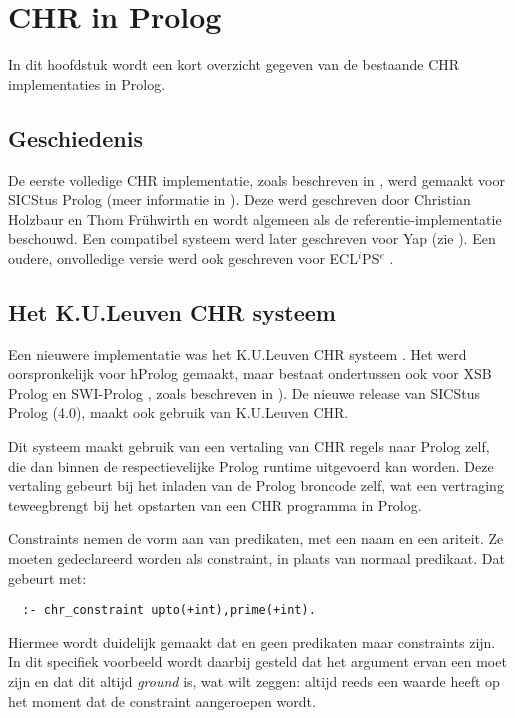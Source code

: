 \chapter{CHR in Prolog} \label{chap:chrprolog}

In dit hoofdstuk wordt een kort overzicht gegeven van de bestaande CHR implementaties in Prolog.

\section{Geschiedenis}

De eerste volledige CHR implementatie, zoals beschreven in \cite{christian:system}, werd gemaakt voor SICStus Prolog (meer informatie in \cite{sicstus}). Deze werd geschreven door Christian Holzbaur en Thom Fr\"uhwirth en wordt algemeen als de referentie-implementatie beschouwd. Een compatibel systeem werd later geschreven voor Yap (zie \cite{yap}). Een oudere, onvolledige versie werd ook geschreven voor ECL$^i$PS$^e$ \cite{eclipse}.

\section{Het K.U.Leuven CHR systeem}

Een nieuwere implementatie was het K.U.Leuven CHR systeem \cite{tom:kulchr}. Het werd oorspronkelijk voor hProlog gemaakt, maar bestaat ondertussen ook voor XSB Prolog \cite{xsb} en SWI-Prolog \cite{swiprolog}, zoals beschreven in \cite{tom:swi:wclp2005}). De nieuwe release van SICStus Prolog (4.0), maakt ook gebruik van K.U.Leuven CHR.

Dit systeem maakt gebruik van een vertaling van CHR regels naar Prolog zelf, die dan binnen de respectievelijke Prolog runtime uitgevoerd kan worden. Deze vertaling gebeurt bij het inladen van de Prolog broncode zelf, wat een vertraging teweegbrengt bij het opstarten van een CHR programma in Prolog.

Constraints nemen de vorm aan van predikaten, met een naam en een ariteit. Ze moeten gedeclareerd worden als constraint, in plaats van normaal predikaat. Dat gebeurt met: \begin{Verbatim}
  :- chr_constraint upto(+int),prime(+int).
\end{Verbatim}
Hiermee wordt duidelijk gemaakt dat  en  geen predikaten maar constraints zijn. In dit specifiek voorbeeld wordt daarbij gesteld dat het argument ervan een  moet zijn en dat dit altijd {\em ground} is, wat wilt zeggen: altijd reeds een waarde heeft op het moment dat de constraint aangeroepen wordt.

